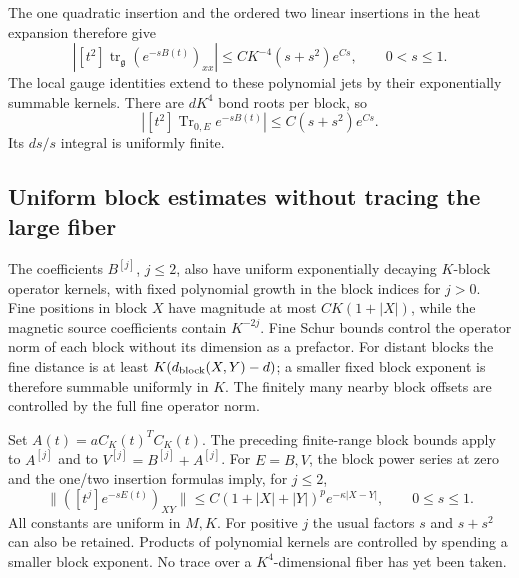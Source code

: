 The one quadratic insertion and the ordered two linear
insertions in the heat expansion therefore give
\begin{equation}
 \left|[t^2]\operatorname{tr}_{\mathfrak g}
                         (e^{-sB(t)})_{xx}\right|
        \le CK^{-4}(s+s^2)e^{Cs},\qquad 0<s\le1.
 \label{vst-base-diagonal}
\end{equation}
The local gauge identities extend to these polynomial
jets by their exponentially summable kernels.
There are \(dK^4\) bond roots per block, so
\begin{equation}
 \left|[t^2]\operatorname{Tr}_{0,E}e^{-sB(t)}\right|
                  \le C(s+s^2)e^{Cs}.
 \label{vst-base-trace}
\end{equation}
Its \(ds/s\) integral is uniformly finite.

\subsection{Uniform block estimates without tracing the large fiber}
\label{vst-block-section}

The coefficients \(B^{[j]}\), \(j\le2\), also have
uniform exponentially decaying \(K\)-block operator
kernels, with fixed polynomial growth in the block
indices for \(j>0\). Fine positions in block \(X\)
have magnitude at most \(CK(1+|X|)\), while the
magnetic source coefficients contain \(K^{-2j}\).
Fine Schur bounds control the operator norm of each
block without its dimension as a prefactor.
For distant blocks the fine distance is at least
\(K(d_{\rm block}(X,Y)-d)\); a smaller fixed block
exponent is therefore summable uniformly in \(K\).
The finitely many nearby block offsets are controlled
by the full fine operator norm.

Set \(A(t)=aC_K(t)^TC_K(t)\). The preceding finite-range
block bounds apply to \(A^{[j]}\) and to
\(V^{[j]}=B^{[j]}+A^{[j]}\).
For \(E=B,V\), the block power series at zero and the
one/two insertion formulas imply, for \(j\le2\),
\begin{equation}
 \big\|([t^j]e^{-sE(t)})_{XY}\big\|
 \le C(1+|X|+|Y|)^p e^{-\kappa|X-Y|},
                         \qquad 0\le s\le1.
 \label{vst-semigroup-block}
\end{equation}
All constants are uniform in \(M,K\).
For positive \(j\) the usual factors \(s\) and
\(s+s^2\) can also be retained. Products of polynomial
kernels are controlled by spending a smaller block
exponent. No trace over a \(K^4\)-dimensional fiber
has yet been taken.

